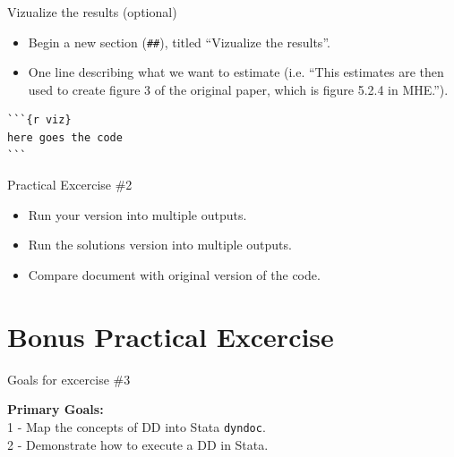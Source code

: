\documentclass[ignorenonframetext,]{beamer}
\providecommand{\tightlist}{%
  \setlength{\itemsep}{0pt}\setlength{\parskip}{0pt}}
\begin{document}
\begin{frame}[fragile]{Vizualize the results (optional)}
\protect\hypertarget{vizualize-the-results-optional}{}

\begin{itemize}
\tightlist
\item
  Begin a new section (\texttt{\#\#}), titled ``Vizualize the
  results''.\\
\item
  One line describing what we want to estimate (i.e. ``This estimates
  are then used to create figure 3 of the original paper, which is
  figure 5.2.4 in MHE.'').\\
\end{itemize}

\begin{verbatim}
```{r viz}
here goes the code
```
\end{verbatim}

\end{frame}

\begin{frame}{Practical Excercise \#2}
\protect\hypertarget{practical-excercise-2-1}{}

\begin{itemize}
\tightlist
\item
  Run your version into multiple outputs.\\
\item
  Run the solutions version into multiple outputs.\\
\item
  Compare document with original version of the code.
\end{itemize}

\end{frame}

\hypertarget{bonus-practical-excercise}{%
\section{Bonus Practical Excercise}\label{bonus-practical-excercise}}

\begin{frame}[fragile]{Goals for excercise \#3}
\protect\hypertarget{goals-for-excercise-3}{}

\textbf{Primary Goals:}\\
1 - Map the concepts of DD into Stata \texttt{dyndoc}.\\
2 - Demonstrate how to execute a DD in Stata.

\end{frame}
\end{document}
